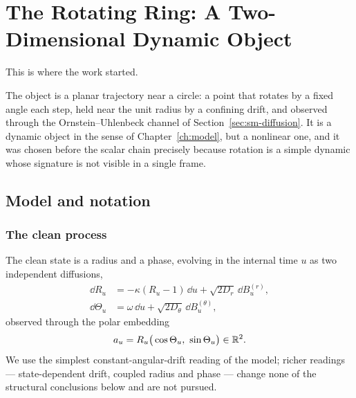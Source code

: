 %

\chapter{The Rotating Ring: A Two-Dimensional Dynamic Object}
\label{ch:ring}

This is where the work started.

The object is a planar trajectory near a circle: a point that rotates by a
fixed angle each step, held near the unit radius by a confining drift, and
observed through the Ornstein--Uhlenbeck channel of
Section~\ref{sec:sm-diffusion}. It is a dynamic object in the sense of
Chapter~\ref{ch:model}, but a nonlinear one, and it was chosen before the
scalar chain precisely because rotation is a simple dynamic whose
signature is not visible in a single frame.

\section{Model and notation}\label{sec:ring-model}

\subsection{The clean process}

The clean state is a radius and a phase, evolving in the internal time $u$ as
two independent diffusions,
\begin{align}
  \dd R_u &= -\kappa (R_u - 1)\,\dd u + \sqrt{2 D_r}\, \dd B_u^{(r)} ,
  \label{eq:ring-radial-sde} \\
  \dd \Theta_u &= \omega\, \dd u + \sqrt{2 D_\theta}\, \dd B_u^{(\theta)} ,
  \label{eq:ring-angular-sde}
\end{align}
observed through the polar embedding
\begin{equation}
  a_u = R_u \big(\cos\Theta_u,\ \sin\Theta_u\big) \in \R^2 .
  \label{eq:ring-embedding}
\end{equation}
We use the simplest constant-angular-drift reading of the model; richer
readings --- state-dependent drift, coupled radius and phase --- change none of
the structural conclusions below and are not pursued.


